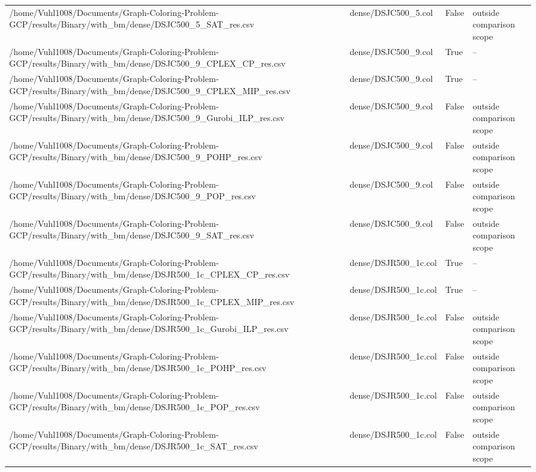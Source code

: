 \begin{table}[htbp]
\begin{tabular}{llll}
/home/Vuhl1008/Documents/Graph-Coloring-Problem-GCP/results/Binary/with\_bm/dense/DSJC500\_5\_SAT\_res.csv & dense/DSJC500\_5.col & False & outside comparison scope \\
/home/Vuhl1008/Documents/Graph-Coloring-Problem-GCP/results/Binary/with\_bm/dense/DSJC500\_9\_CPLEX\_CP\_res.csv & dense/DSJC500\_9.col & True & -- \\
/home/Vuhl1008/Documents/Graph-Coloring-Problem-GCP/results/Binary/with\_bm/dense/DSJC500\_9\_CPLEX\_MIP\_res.csv & dense/DSJC500\_9.col & True & -- \\
/home/Vuhl1008/Documents/Graph-Coloring-Problem-GCP/results/Binary/with\_bm/dense/DSJC500\_9\_Gurobi\_ILP\_res.csv & dense/DSJC500\_9.col & False & outside comparison scope \\
/home/Vuhl1008/Documents/Graph-Coloring-Problem-GCP/results/Binary/with\_bm/dense/DSJC500\_9\_POHP\_res.csv & dense/DSJC500\_9.col & False & outside comparison scope \\
/home/Vuhl1008/Documents/Graph-Coloring-Problem-GCP/results/Binary/with\_bm/dense/DSJC500\_9\_POP\_res.csv & dense/DSJC500\_9.col & False & outside comparison scope \\
/home/Vuhl1008/Documents/Graph-Coloring-Problem-GCP/results/Binary/with\_bm/dense/DSJC500\_9\_SAT\_res.csv & dense/DSJC500\_9.col & False & outside comparison scope \\
/home/Vuhl1008/Documents/Graph-Coloring-Problem-GCP/results/Binary/with\_bm/dense/DSJR500\_1c\_CPLEX\_CP\_res.csv & dense/DSJR500\_1c.col & True & -- \\
/home/Vuhl1008/Documents/Graph-Coloring-Problem-GCP/results/Binary/with\_bm/dense/DSJR500\_1c\_CPLEX\_MIP\_res.csv & dense/DSJR500\_1c.col & True & -- \\
/home/Vuhl1008/Documents/Graph-Coloring-Problem-GCP/results/Binary/with\_bm/dense/DSJR500\_1c\_Gurobi\_ILP\_res.csv & dense/DSJR500\_1c.col & False & outside comparison scope \\
/home/Vuhl1008/Documents/Graph-Coloring-Problem-GCP/results/Binary/with\_bm/dense/DSJR500\_1c\_POHP\_res.csv & dense/DSJR500\_1c.col & False & outside comparison scope \\
/home/Vuhl1008/Documents/Graph-Coloring-Problem-GCP/results/Binary/with\_bm/dense/DSJR500\_1c\_POP\_res.csv & dense/DSJR500\_1c.col & False & outside comparison scope \\
/home/Vuhl1008/Documents/Graph-Coloring-Problem-GCP/results/Binary/with\_bm/dense/DSJR500\_1c\_SAT\_res.csv & dense/DSJR500\_1c.col & False & outside comparison scope \\

\end{tabular}
\end{table}
